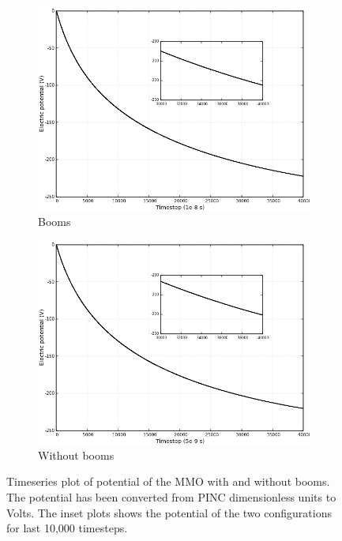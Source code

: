 \begin{center}
    \begin{figure}[H]
      \begin{subfigure}[b]{0.75\textwidth}
      \includegraphics[width=\columnwidth]{figures/MMO/noPH/WB/C_noPH_WB.png}
      \caption{Booms}
      \label{fig:C_noPH_WB}
    \end{subfigure}
    \par\bigskip
    \begin{subfigure}[b]{0.75\textwidth}
      \includegraphics[width=\columnwidth]{figures/MMO/noPH/NB/C_noPH_NB.png}
      \caption{Without booms}
      \label{fig:C_noPH_NB}
    \end{subfigure}
  \label{fig:ConvnoPH}
  \caption{Timeseries plot of potential of the MMO with and without booms. The potential has been converted from PINC dimensionless units to Volts. The inset plots shows the potential of the two configurations for last 10,000 timesteps.}
  \end{figure}
\end{center}

